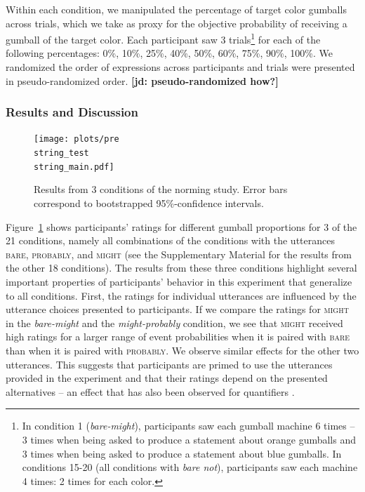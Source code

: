 \documentclass[lucida,biblatex]{sp} %
\newcommand{\jd}[1]{\textcolor{PinkyPurple}{\textbf{[jd: #1]}}}
\begin{document}
\noindent Within each condition, we manipulated the percentage of target color gumballs across trials, which we take as proxy for the objective probability of receiving a gumball of the target color. 
Each participant saw 3 trials\footnote{In condition 1 (\textit{bare-might}), participants saw each gumball machine 6 times -- 3 times when being asked to produce a statement about orange gumballs and 3 times when being asked to produce a statement about blue gumballs. In conditions 15-20 (all conditions with \textit{bare not}), participants saw each machine 4 times: 2 times for each color.} 
for each of the following percentages: 0\%, 10\%, 25\%, 40\%, 50\%, 60\%, 75\%, 90\%, 100\%. We randomized the order of expressions across participants and trials were presented in pseudo-randomized order. \jd{pseudo-randomized how?}


\subsubsection{Results and Discussion}

\begin{figure}
\texttt{[image: plots/pre\\string\_test\\string\_main.pdf]} 
\caption{Results from 3 conditions of the norming study. Error bars correspond to bootstrapped 95\%-confidence intervals. \label{fig:norming-results-main} }
\end{figure}

Figure~\ref{fig:norming-results-main} shows participants' ratings for different gumball proportions for 3 of the 21 conditions, namely all combinations of the conditions
with the utterances \textsc{bare}, \textsc{probably}, and \textsc{might} (see the Supplementary Material for the results from the other 18 conditions). 
The results from these three conditions highlight several important properties of participants'
behavior in this experiment that generalize to all conditions.
First, the ratings for individual utterances are influenced by the utterance choices presented to participants.
If we compare the ratings for \textsc{might} in the \textit{bare-might} and the \textit{might-probably} condition, we see that \textsc{might} received high ratings for a larger
range of event probabilities when it is paired with \textsc{bare} than when it is paired with \textsc{probably}. We observe similar effects for the other two utterances.
This suggests that participants are primed to use the utterances provided in the experiment and that their ratings depend on the presented alternatives -- an effect that
has also been observed for quantifiers \citep{DegenTanenhaus2015}.
\end{document}
